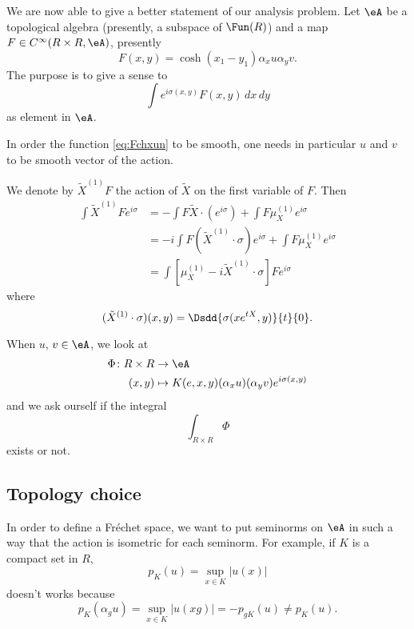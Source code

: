 We are now able to give a better statement of our analysis problem. Let $\eA$ be a topological algebra (presently, a subspace of $\Fun(R)$) and a map $F\in C^{\infty}(R\times R,\eA)$, presently
\begin{equation} \label{eq:Fchxun}
F(x,y)=\cosh(x_1-y_1)\alpha_x u\alpha_yv.
\end{equation}
The purpose is to give a sense to 
\begin{equation}
\int e^{i\sigma(x,y)}F(x,y)\,dx\,dy
\end{equation}
as element in $\eA$.

\begin{remark}
In order the function \eqref{eq:Fchxun} to be smooth, one needs in particular $u$ and $v$ to be smooth vector of the action. 
\end{remark}

We denote by $\tilde X^{(1)}F$ the action of $\tilde X$ on the first variable of $F$. Then
\begin{equation}
\begin{split}
\int \tilde X^{(1)}F e^{i\sigma}&=-\int F\tilde X\cdot(e^{i\sigma})+\int F\mu^{(1)}_Xe^{i\sigma}\\
		&=-i\int F(\tilde X^{(1)}\cdot \sigma)e^{i\sigma}+\int F\mu_X^{(1)}e^{i\sigma}\\
		&=\int [\mu_X^{(1)}-i\tilde X^{(1)}\cdot \sigma]Fe^{i\sigma}
\end{split}
\end{equation}
where 
\begin{equation}
  (\tilde X^{(1)}\cdot \sigma)(x,y)=\Dsdd{ \sigma(xe^{tX},y) }{t}{0}.
\end{equation}

When $u$, $v\in\eA$, we look at
		\begin{equation}
		\begin{aligned}
			\Phi \colon R\times R &\to \eA\\
			(x,y)&\mapsto K(e,x,y)(\alpha_xu)(\alpha_yv)e^{i\sigma(x,y)}
		\end{aligned}
	\end{equation}
 and we ask ourself if the integral
\[ 
  \int_{R\times R}\Phi
\]
exists or not.

\subsection{Topology choice}

In order to define a Fréchet space, we want to put seminorms on $\eA$ in such a way that the action is isometric for each seminorm. For example, if $K$ is a compact set in $R$,
\[ 
  p_K(u)=\sup_{x\in K}| u(x) |
\]
doesn't works because
\[ 
  p_K(\alpha_gu)=\sup_{x\in K}| u(xg) | =-p_{gK}(u)\neq p_K(u).
\]

